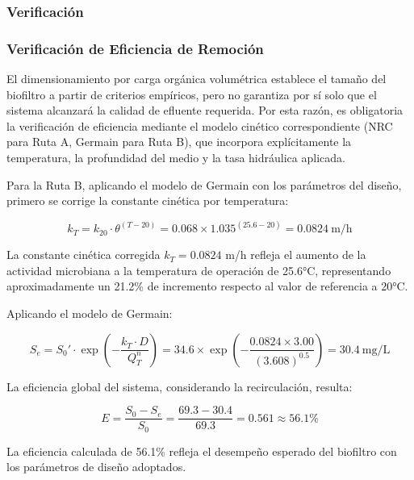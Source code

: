 \documentclass[12pt,a4paper]{article}
\begin{document}
\subsubsection{Verificación}

\subsubsection*{Verificación de Eficiencia de Remoción}

El dimensionamiento por carga orgánica volumétrica establece el tamaño del biofiltro a partir de criterios empíricos, pero no garantiza por sí solo que el sistema alcanzará la calidad de efluente requerida. Por esta razón, es obligatoria la verificación de eficiencia mediante el modelo cinético correspondiente (NRC para Ruta A, Germain para Ruta B), que incorpora explícitamente la temperatura, la profundidad del medio y la tasa hidráulica aplicada.

Para la Ruta B, aplicando el modelo de Germain con los parámetros del diseño, primero se corrige la constante cinética por temperatura:

\begin{equation}
k_T = k_{20} \cdot \theta^{(T-20)} = 0.068 \times 1.035^{(25.6-20)} = 0.0824\ \text{m/h}
\end{equation}

La constante cinética corregida $k_T = 0.0824$ m/h refleja el aumento de la actividad microbiana a la temperatura de operación de 25.6°C, representando aproximadamente un 21.2\% de incremento respecto al valor de referencia a 20°C.

Aplicando el modelo de Germain:

\begin{equation}
S_e = S_0' \cdot \exp\!\left(-\frac{k_T \cdot D}{Q_T^n}\right) = 34.6 \times \exp\!\left(-\frac{0.0824 \times 3.00}{(3.608)^{0.5}}\right) = 30.4\ \text{mg/L}
\end{equation}

La eficiencia global del sistema, considerando la recirculación, resulta:

\begin{equation}
E = \frac{S_0 - S_e}{S_0} = \frac{69.3 - 30.4}{69.3} = 0.561 \approx 56.1\%
\end{equation}

La eficiencia calculada de 56.1\% refleja el desempeño esperado del biofiltro con los parámetros de diseño adoptados.
\end{document}
